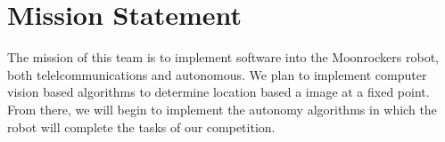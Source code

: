 
\section{Mission Statement}
The mission of this team is to implement software into the Moonrockers robot, both telelcommunications and autonomous. We plan to implement computer vision based algorithms to determine location based a image at a fixed point. From there, we will begin to implement the autonomy algorithms in which the robot will complete the tasks of our competition. 

